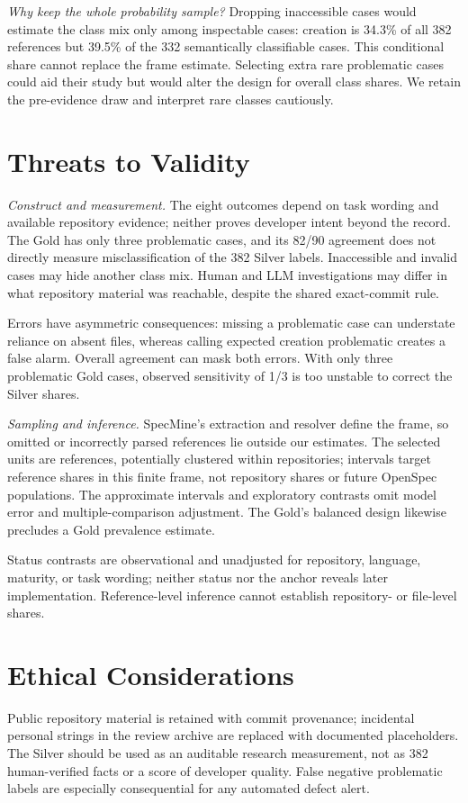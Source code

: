 \documentclass[10pt,conference]{IEEEtran}
\begin{document}
\emph{Why keep the whole probability sample?} Dropping inaccessible cases would estimate the class mix only among inspectable cases: creation is 34.3\% of all 382 references but 39.5\% of the 332 semantically classifiable cases. This conditional share cannot replace the frame estimate. Selecting extra rare problematic cases could aid their study but would alter the design for overall class shares. We retain the pre-evidence draw and interpret rare classes cautiously.

\section{Threats to Validity}
\emph{Construct and measurement.} The eight outcomes depend on task wording and available repository evidence; neither proves developer intent beyond the record. The Gold has only three problematic cases, and its 82/90 agreement does not directly measure misclassification of the 382 Silver labels. Inaccessible and invalid cases may hide another class mix. Human and LLM investigations may differ in what repository material was reachable, despite the shared exact-commit rule.

Errors have asymmetric consequences: missing a problematic case can understate reliance on absent files, whereas calling expected creation problematic creates a false alarm. Overall agreement can mask both errors. With only three problematic Gold cases, observed sensitivity of 1/3 is too unstable to correct the Silver shares.

\emph{Sampling and inference.} SpecMine's extraction and resolver define the frame, so omitted or incorrectly parsed references lie outside our estimates. The selected units are references, potentially clustered within repositories; intervals target reference shares in this finite frame, not repository shares or future OpenSpec populations. The approximate intervals and exploratory contrasts omit model error and multiple-comparison adjustment. The Gold's balanced design likewise precludes a Gold prevalence estimate.

Status contrasts are observational and unadjusted for repository, language, maturity, or task wording; neither status nor the anchor reveals later implementation. Reference-level inference cannot establish repository- or file-level shares.

\section{Ethical Considerations}
Public repository material is retained with commit provenance; incidental personal strings in the review archive are replaced with documented placeholders. The Silver should be used as an auditable research measurement, not as 382 human-verified facts or a score of developer quality. False negative problematic labels are especially consequential for any automated defect alert.
\end{document}
